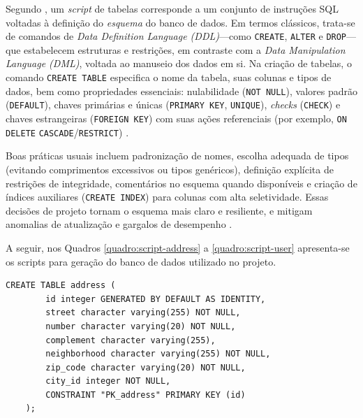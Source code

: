 Segundo \textcite{Machado2020}, um \emph{script} de tabelas corresponde a um conjunto de instruções SQL voltadas à definição do \emph{esquema} do banco de dados. Em termos clássicos, trata-se de comandos de \emph{Data Definition Language (DDL)}---como \texttt{CREATE}, \texttt{ALTER} e \texttt{DROP}---que estabelecem estruturas e restrições, em contraste com a \emph{Data Manipulation Language (DML)}, voltada ao manuseio dos dados em si. Na criação de tabelas, o comando \texttt{CREATE TABLE} especifica o nome da tabela, suas colunas e tipos de dados, bem como propriedades essenciais: nulabilidade (\texttt{NOT NULL}), valores padrão (\texttt{DEFAULT}), chaves primárias e únicas (\texttt{PRIMARY KEY}, \texttt{UNIQUE}), \emph{checks} (\texttt{CHECK}) e chaves estrangeiras (\texttt{FOREIGN KEY}) com suas ações
referenciais (por exemplo, \texttt{ON DELETE} \texttt{CASCADE}/\texttt{RESTRICT}) \parencite{Machado2020}.

Boas práticas usuais incluem padronização de nomes, escolha adequada de tipos (evitando comprimentos excessivos ou tipos genéricos), definição explícita de restrições de integridade, comentários no esquema quando disponíveis e criação de índices auxiliares (\texttt{CREATE INDEX}) para colunas com alta seletividade. Essas decisões de projeto tornam o esquema mais claro e resiliente, e mitigam anomalias de atualização e gargalos de desempenho \parencite{Machado2020}.

A seguir, nos Quadros \ref{quadro:script-address} a \ref{quadro:script-user} apresenta-se os scripts para geração do banco de dados utilizado no projeto.

\begin{quadro}[H]
	\caption[Script SQL --- Tabela \texttt{address}]{Script SQL --- Tabela \texttt{address}}
	\label{quadro:script-address}
	
	\begin{minipage}{0.96\textwidth}
		\begin{lstlisting}[style=academic-sql]
	CREATE TABLE address (
		id integer GENERATED BY DEFAULT AS IDENTITY,
		street character varying(255) NOT NULL,
		number character varying(20) NOT NULL,
		complement character varying(255),
		neighborhood character varying(255) NOT NULL,
		zip_code character varying(20) NOT NULL,
		city_id integer NOT NULL,
		CONSTRAINT "PK_address" PRIMARY KEY (id)
	);
		\end{lstlisting}
	\end{minipage}
	
\end{quadro}

